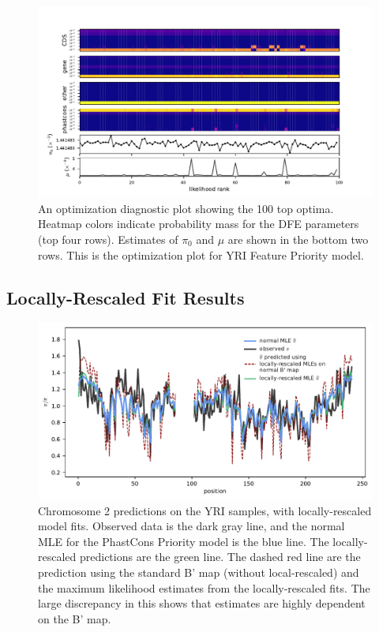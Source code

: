\documentclass[11pt]{article}
\begin{document}
\begin{figure}[htbp]
  \label{suppfig:diag-plot}
  \centering
  \includegraphics[width=\textwidth]{figures/supplementary/figure_feature_priority_yri_full_diag.pdf}

  \caption{ An optimization diagnostic plot showing the 100 top optima. Heatmap
  colors indicate probability mass for the DFE parameters (top four rows).
  Estimates of $\pi_0$ and $\mu$ are shown in the bottom two rows. This is the
optimization plot for YRI Feature Priority model.}
\end{figure}

\subsection{Locally-Rescaled Fit Results}

\begin{figure}[htbp]
    \label{suppfig:rescale}
  \centering
  \includegraphics[]{figures/supplementary/rescale_pi_pred_plot.pdf}

  \caption{Chromosome 2 predictions on the YRI samples, with locally-rescaled
      model fits. Observed data is the dark gray line, and the normal MLE for
      the PhastCons Priority model is the blue line. The locally-rescaled
      predictions are the green line. The dashed red line are the prediction
      using the standard B' map (without local-rescaled) and the maximum likelihood
      estimates from the locally-rescaled fits. The large discrepancy in this shows
      that estimates are highly dependent on the B' map.}
\end{figure}
\end{document}
